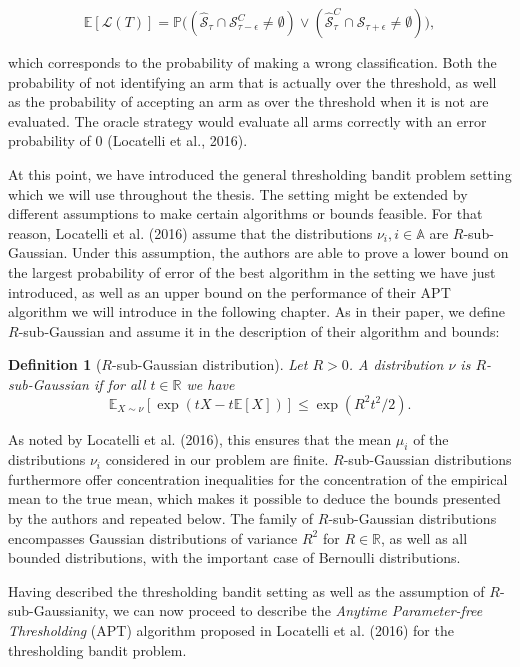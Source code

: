 \documentclass[11pt,]{article}
\newtheorem{definition}{Definition}
\begin{document}
\[
\mathbb{E}[\mathcal{L}(T)] = \mathbb{P}\big((\hat{\mathcal{S}}_{\tau} \cap \mathcal{S}_{\tau-\epsilon}^C \neq \emptyset) \lor(\hat{\mathcal{S}}_{\tau}^C \cap \mathcal{S}_{\tau+\epsilon} \neq \emptyset)\big),
\]

which corresponds to the probability of making a wrong classification.
Both the probability of not identifying an arm that is actually over the
threshold, as well as the probability of accepting an arm as over the
threshold when it is not are evaluated. The oracle strategy would
evaluate all arms correctly with an error probability of \(0\)
(Locatelli et al., 2016).

At this point, we have introduced the general thresholding bandit
problem setting which we will use throughout the thesis. The setting
might be extended by different assumptions to make certain algorithms or
bounds feasible. For that reason, Locatelli et al. (2016) assume that
the distributions \(\nu_i, i \in \mathbb{A}\) are \(R\)-sub-Gaussian.
Under this assumption, the authors are able to prove a lower bound on
the largest probability of error of the best algorithm in the setting we
have just introduced, as well as an upper bound on the performance of
their APT algorithm we will introduce in the following chapter. As in
their paper, we define \(R\)-sub-Gaussian and assume it in the
description of their algorithm and bounds:

\begin{definition}[$R$-sub-Gaussian distribution] 
\label{definition:rsubgaussian}
Let $R > 0$. A distribution $\nu$ is $R$-sub-Gaussian if for all $t \in \mathbb{R}$ we have
\begin{equation*}
\mathbb{E}_{X \sim \nu}[\exp(tX - t\mathbb{E}[X])] \leq \exp(R^2t^2/2).
\end{equation*}
\end{definition}

As noted by Locatelli et al. (2016), this ensures that the mean
\(\mu_i\) of the distributions \(\nu_i\) considered in our problem are
finite. \(R\)-sub-Gaussian distributions furthermore offer concentration
inequalities for the concentration of the empirical mean to the true
mean, which makes it possible to deduce the bounds presented by the
authors and repeated below. The family of \(R\)-sub-Gaussian
distributions encompasses Gaussian distributions of variance \(R^2\) for
\(R \in \mathbb{R}\), as well as all bounded distributions, with the
important case of Bernoulli distributions.

Having described the thresholding bandit setting as well as the
assumption of \(R\)-sub-Gaussianity, we can now proceed to describe the
\emph{Anytime Parameter-free Thresholding} (APT) algorithm proposed in
Locatelli et al. (2016) for the thresholding bandit problem.
\end{document}
